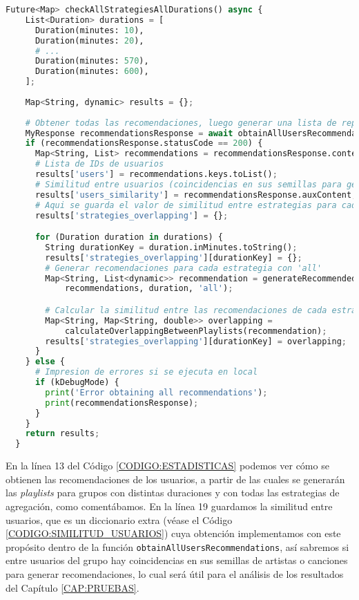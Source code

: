 \begin{lstlisting}[language=python, caption=Generación de estadísticas, label=CODIGO:ESTADISTICAS]
  Future<Map> checkAllStrategiesAllDurations() async {
    List<Duration> durations = [
      Duration(minutes: 10),
      Duration(minutes: 20),
      # ...
      Duration(minutes: 570),
      Duration(minutes: 600),
    ];
  
    Map<String, dynamic> results = {};
  
    # Obtener todas las recomendaciones, luego generar una lista de reproduccion para cada estrategia y duracion
    MyResponse recommendationsResponse = await obtainAllUsersRecommendations();
    if (recommendationsResponse.statusCode == 200) {
      Map<String, List> recommendations = recommendationsResponse.content;
      # Lista de IDs de usuarios
      results['users'] = recommendations.keys.toList(); 
      # Similitud entre usuarios (coincidencias en sus semillas para generar recomendaciones)
      results['users_similarity'] = recommendationsResponse.auxContent;
      # Aqui se guarda el valor de similitud entre estrategias para cada duracion 
      results['strategies_overlapping'] = {};

      for (Duration duration in durations) {
        String durationKey = duration.inMinutes.toString();
        results['strategies_overlapping'][durationKey] = {};
        # Generar recomendaciones para cada estrategia con 'all'
        Map<String, List<dynamic>> recommendation = generateRecommendedPlaylist(
            recommendations, duration, 'all');

        # Calcular la similitud entre las recomendaciones de cada estrategia
        Map<String, Map<String, double>> overlapping =
            calculateOverlappingBetweenPlaylists(recommendation);
        results['strategies_overlapping'][durationKey] = overlapping;
      }
    } else {
      # Impresion de errores si se ejecuta en local
      if (kDebugMode) {
        print('Error obtaining all recommendations');
        print(recommendationsResponse);
      }
    }
    return results;
  }
\end{lstlisting}

En la línea 13 del Código \ref{CODIGO:ESTADISTICAS} podemos ver cómo se obtienen las recomendaciones de los usuarios, a partir de las 
cuales se generarán las \textit{playlists} para grupos con distintas duraciones y con todas las estrategias de agregación, como comentábamos.
En la línea 19 guardamos la similitud entre usuarios, que es un diccionario extra (véase el Código \ref{CODIGO:SIMILITUD_USUARIOS}) cuya obtención 
implementamos con este propósito dentro de la función \texttt{obtainAllUsersRecommendations}, así sabremos si entre usuarios del grupo hay 
coincidencias en sus semillas de artistas o canciones para generar recomendaciones, lo cual será útil para el análisis de los resultados 
del Capítulo \ref{CAP:PRUEBAS}. 

